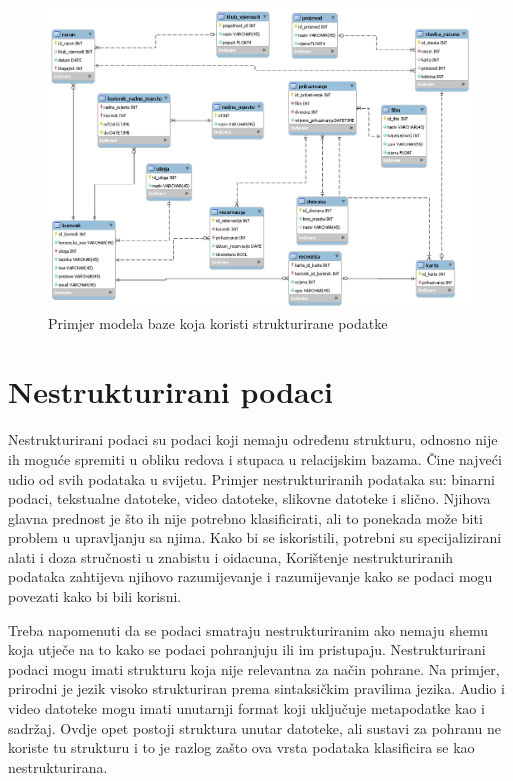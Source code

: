 \documentclass{foi}
\begin{document}
\begin{figure}[h!]
    \centering
    \includegraphics[width=1\textwidth]{slike/strukturirani.png}
    \caption{Primjer modela baze koja koristi strukturirane podatke}
    \label{strukturirani}
\end{figure}

\section{Nestrukturirani podaci}

Nestrukturirani podaci su podaci koji nemaju određenu strukturu, odnosno nije ih moguće spremiti u obliku redova i stupaca u relacijskim bazama. Čine najveći udio od svih podataka u svijetu. Primjer nestrukturiranih podataka su: binarni podaci, tekstualne datoteke, video datoteke, slikovne datoteke i slično. Njihova glavna prednost je što ih nije potrebno klasificirati, ali to ponekada može biti problem u upravljanju sa njima. Kako bi se iskoristili, potrebni su specijalizirani alati i doza stručnosti u znabistu i oidacuna, Korištenje nestrukturiranih podataka zahtijeva njihovo razumijevanje i razumijevanje kako se podaci mogu povezati kako bi bili korisni. \cite{unstructuredStructuredSemiStructured}

Treba napomenuti da se podaci smatraju nestrukturiranim ako nemaju shemu koja utječe na to kako se podaci pohranjuju ili im pristupaju. Nestrukturirani podaci mogu imati strukturu koja nije relevantna za način pohrane. Na primjer, prirodni je jezik visoko strukturiran prema sintaksičkim pravilima jezika. Audio i video datoteke mogu imati unutarnji format koji uključuje metapodatke kao i sadržaj. Ovdje opet postoji struktura unutar datoteke, ali sustavi za pohranu ne koriste tu strukturu i to je razlog zašto ova vrsta podataka klasificira se kao nestrukturirana. \cite{dataEngineerStudyGuide} 
\end{document}

